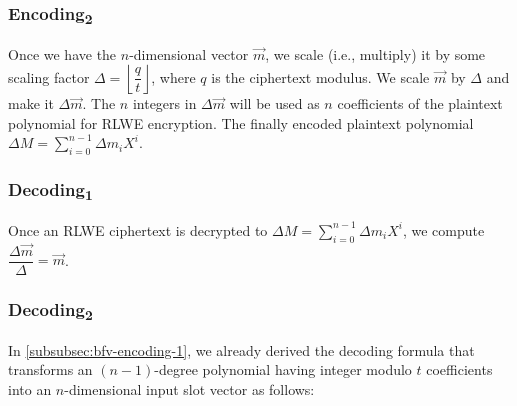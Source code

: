 \subsubsection{\textsf{Encoding\textsubscript{2}}}  

Once we have the $n$-dimensional vector $\vec{m}$, we scale (i.e., multiply) it by some scaling factor $\Delta = \left\lfloor \dfrac{q}{t} \right\rfloor$, where $q$ is the ciphertext modulus. We scale $\vec{m}$ by $\Delta$ and make it $\Delta \vec{m}$. 
The $n$ integers in $\Delta\vec{m}$ will be used as $n$ coefficients of the plaintext polynomial for RLWE encryption. The finally encoded plaintext polynomial $\Delta M = \sum\limits_{i=0}^{n-1}\Delta m_iX^i$. 


\subsubsection{\textsf{Decoding\textsubscript{1}}}  
\label{subsubsec:bfv-enc-dec-decoding1} 

Once an RLWE ciphertext is decrypted to $\Delta M = \sum\limits_{i=0}^{n-1}\Delta m_iX^i$, we compute $\dfrac{\Delta\vec{m}}{\Delta} = \vec{m}$.




\subsubsection{\textsf{Decoding\textsubscript{2}}}  


In \autoref{subsubsec:bfv-encoding-1}, we already derived the decoding formula that transforms an $(n-1)$-degree polynomial having integer modulo $t$ coefficients into an $n$-dimensional input slot vector as follows: 

